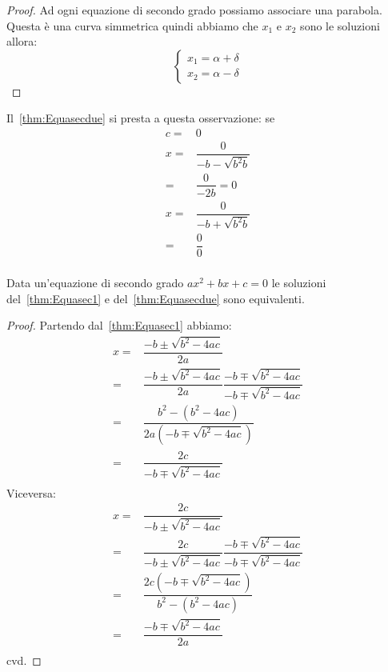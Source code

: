 \begin{proof}
	Ad ogni equazione di secondo grado possiamo associare una parabola. Questa  
	è una curva simmetrica quindi abbiamo che $x_1$ e $x_2$ sono le soluzioni 
	allora:  \[\left\{\begin{array}{l}
			x_1=\alpha+\delta\\
			x_2=\alpha-\delta
		\end{array}\right.\] 
\end{proof}
\begin{commento}
	Il~\vref{thm:Equasecdue} si presta a questa osservazione: se
	\begin{align*}
		c=&0\\
		x=&\dfrac{0}{-b-\sqrt{b^2b}}\\
		=&\dfrac{0}{-2b}=0\\
		x=&\dfrac{0}{-b+\sqrt{b^2b}}\\
		=&\dfrac{0}{0}\\
	\end{align*}
\end{commento}
\begin{thm}[Equivalenza]
	Data un'equazione di secondo grado $ax^2+bx+c=0$ le soluzioni 
	del~\vref{thm:Equasec1} e del~\vref{thm:Equasecdue} sono equivalenti.
\end{thm}
\begin{proof}
	Partendo dal~\vref{thm:Equasec1} abbiamo:
	\begin{align*}
	 x=&\dfrac{-b\pm\sqrt{b^2-4ac}}{2a}\\
	=&\dfrac{-b\pm\sqrt{b^2-4ac}}{2a}\dfrac{-b\mp\sqrt{b^2-4ac}}{-b\mp\sqrt{b^2-4ac}}\\
	=&\dfrac{b^2-(b^2-4ac)}{2a(-b\mp\sqrt{b^2-4ac})}\\
	=&\dfrac{2c}{-b\mp\sqrt{b^2-4ac}}\\
	\end{align*}
Viceversa:
\begin{align*}
	x=&\dfrac{2c}{-b\pm\sqrt{b^2-4ac}}\\
	=&\dfrac{2c}{-b\pm\sqrt{b^2-4ac}}\dfrac{-b\mp\sqrt{b^2-4ac}}{-b\mp\sqrt{b^2-4ac}}\\
	=&\dfrac{2c(-b\mp\sqrt{b^2-4ac})}{b^2-(b^2-4ac)}\\
	=&\dfrac{-b\mp\sqrt{b^2-4ac}}{2a}\\
\end{align*}
cvd.
\end{proof}

